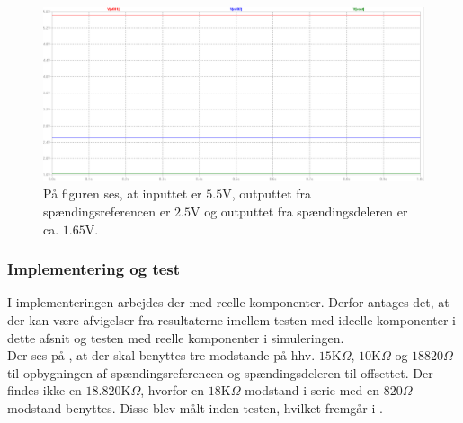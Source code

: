 \begin{figure}[H]
	\centering
	\includegraphics[scale=.3]{figures/cProblemloesning/Reference_sim_off.PNG}
	\caption{På figuren ses, at inputtet er $5.5$V, outputtet fra spændingsreferencen er $2.5$V og outputtet fra spændingsdeleren er ca. $1.65$V.}
	\label{fig:Spaendingsreference_offset_sim}
\end{figure}

\subsubsection{Implementering og test}\label{spaendingsref_resultat}
I implementeringen arbejdes der med reelle komponenter. Derfor antages det, at der kan være afvigelser fra resultaterne imellem testen med ideelle komponenter i dette afsnit og testen med reelle komponenter i simuleringen. \\
Der ses på , at der skal benyttes tre modstande på hhv. $15$K$\Omega$, $10$K$\Omega$ og $18820 \Omega$ til opbygningen af spændingsreferencen og spændingsdeleren til offsettet. Der findes ikke en $18.820$K$\Omega$, hvorfor en $18$K$\Omega$ modstand i serie med en $820\Omega$ modstand benyttes. Disse blev målt inden testen, hvilket fremgår i .


